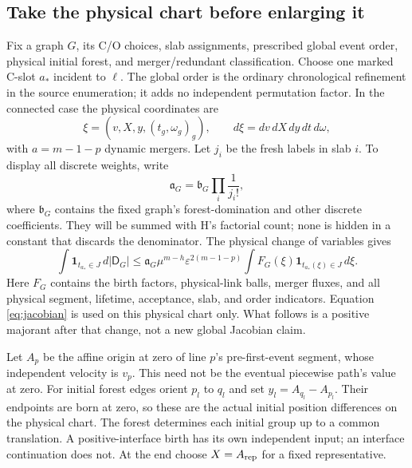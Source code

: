 \documentclass[11pt]{article}
\newcommand{\eps}{\varepsilon}
\newcommand{\ind}{\mathbf1}
\newcommand{\dd}{\,d}
\theoremstyle{definition}\newtheorem{definition}[theorem]{Definition}
\theoremstyle{remark}\newtheorem{remark}[theorem]{Remark}
\numberwithin{equation}{section}
\begin{document}
\subsection{Take the physical chart before enlarging it}\label{subsec:physical}
Fix a graph $G$, its C/O choices, slab assignments, prescribed global event
order, physical initial forest, and merger/redundant classification. Choose
one marked C-slot $a_*$ incident to $\ell$. The global order is the ordinary
chronological refinement in the source enumeration; it adds no independent
permutation factor. In the connected case the physical coordinates are
\[
 \xi=(v,X,y,(t_g,\omega_g)_g),\qquad
 d\xi=dv\dd X\dd y\dd t\dd\omega,
\]
with $a=m-1-p$ dynamic mergers. Let $j_i$ be the fresh labels in slab $i$.
To display all discrete weights, write
\begin{equation}\label{eq:discrete-weight}
 \mathfrak a_G=\mathfrak b_G\prod_i\frac1{j_i!},
\end{equation}
where $\mathfrak b_G$ contains the fixed graph's forest-domination and
other discrete coefficients. They will be summed with H's factorial count;
none is hidden in a constant that discards the denominator. The physical
change of variables gives
\begin{equation}\label{eq:W0}
 \int\ind_{t_{a_*}\in J}\dd|\mathsf D_G|
 \le\mathfrak a_G\mu^{m-h}\eps^{2(m-1-p)}
      \int F_G(\xi)\ind_{t_{a_*}(\xi)\in J}\dd\xi.
\end{equation}
Here $F_G$ contains the birth factors, physical-link balls, merger fluxes,
and all physical segment, lifetime, acceptance, slab, and order indicators.
Equation \eqref{eq:jacobian} is used on this physical chart only. What follows
is a positive majorant after that change, not a new global Jacobian claim.

Let $A_p$ be the affine origin at zero of line $p$'s pre-first-event segment,
whose independent velocity is $v_p$. This need not be the eventual
piecewise path's value at zero. For initial forest edges orient $p_l$ to
$q_l$ and set $y_l=A_{q_l}-A_{p_l}$. Their endpoints are born at zero,
so these are the actual initial position differences on the physical chart.
The forest determines each initial group up to a common translation. A
positive-interface birth has its own independent input; an interface
continuation does not. At the end choose $X=A_{\rm rep}$ for a fixed
representative.
\end{document}
